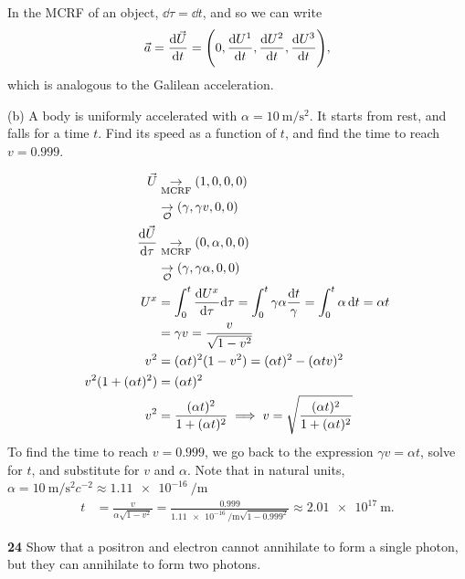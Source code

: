 \documentclass[gr-notes.tex]{subfiles}
\begin{document}
In the MCRF of an object, $\dd\tau = \dd{t}$, and so we can write
%
\begin{displaymath}
  \vec{a} = \dv{\vec{U}}{t} = \qty(0, \dv{U^1}{t}, \dv{U^2}{t}, \dv{U^3}{t}),
\end{displaymath}
%
which is analogous to the Galilean acceleration.

(b) A body is uniformly accelerated with $\alpha = \SI{10}{\meter\per\second^2}$. It starts from rest, and falls for a time $t$. Find its speed as a function of $t$, and find the time to reach $v = 0.999$.

\begin{align*}
  \vec{U} &\underset{\rm MCRF}{\to}
  (1, 0, 0, 0)
  \\ &\underset{\mathcal{O}}{\to}
  (\gamma, \gamma v, 0, 0)
  \\
  \dv{\vec{U}}{\tau} &\underset{\rm MCRF}{\to}
  (0, \alpha, 0, 0)
  \\ &\underset{\mathcal{O}}{\to}
  (\gamma, \gamma \alpha, 0, 0)
  \\
  U^x &=
  \int_0^t \dv{U^x}{\tau} \dd\tau =
  \int_0^t \gamma \alpha \frac{\dd{t}}{\gamma} =
  \int_0^t \alpha \dd{t} =
  \alpha t
  \\ &=
  \gamma v =
  \frac{v}{\sqrt{1 - v^2}}
  \\
  v^2 &=
  (\alpha t)^2 (1 - v^2) =
  (\alpha t)^2 - (\alpha t v)^2
  \\
  v^2 (1 + (\alpha t)^2) &=
  (\alpha t)^2
  \\
  v^2 &=
  \frac{(\alpha t)^2}{1 + (\alpha t)^2} \implies
  v = \sqrt{\frac{(\alpha t)^2}{1 + (\alpha t)^2}}
\end{align*}
%
To find the time to reach $v = 0.999$, we go back to the expression $\gamma v = \alpha t$, solve for $t$, and substitute for $v$ and $\alpha$. Note that in natural units, $\alpha = \SI{10}{\meter\per\second^2} c^{-2} \approx \SI{1.11e-16}{\per\meter}$
%
\begin{align*}
  t &=
  \frac{v}{\alpha \sqrt{1 - v^2}} =
  \frac{0.999}{\SI{1.11e-16}{\per\meter} \sqrt{1 - 0.999^2}} \approx
  \SI{2.01e17}{\meter}.
\end{align*}



\textbf{24}
Show that a positron and electron cannot annihilate to form a single photon, but they can annihilate to form two photons.
\end{document}

